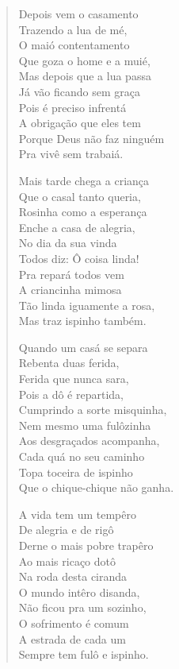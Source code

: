 \begin{verse}
Depois vem o casamento\\
Trazendo a lua de mé,\\
O maió contentamento\\
Que goza o home e a muié,\\
Mas depois que a lua passa\\
Já vão ficando sem graça\\
Pois é preciso infrentá\\
A obrigação que eles tem\\
Porque Deus não faz ninguém\\
Pra vivê sem trabaiá.

Mais tarde chega a criança\\
Que o casal tanto queria,\\
Rosinha como a esperança\\
Enche a casa de alegria,\\
No dia da sua vinda\\
Todos diz: Ô coisa linda!\\
Pra repará todos vem\\
A criancinha mimosa\\
Tão linda iguamente a rosa,\\
Mas traz ispinho também.

Quando um casá se separa\\
Rebenta duas ferida,\\
Ferida que nunca sara,\\
Pois a dô é repartida,\\
Cumprindo a sorte misquinha,\\
Nem mesmo uma fulôzinha\\
Aos desgraçados acompanha,\\
Cada quá no seu caminho\\
Topa toceira de ispinho\\
Que o chique-chique não ganha.

A vida tem um tempêro\\
De alegria e de rigô\\
Derne o mais pobre trapêro\\
Ao mais ricaço dotô\\
Na roda desta ciranda\\
O mundo intêro disanda,\\
Não ficou pra um sozinho,\\
O sofrimento é comum\\
A estrada de cada um\\
Sempre tem fulô e ispinho.


\end{verse}
